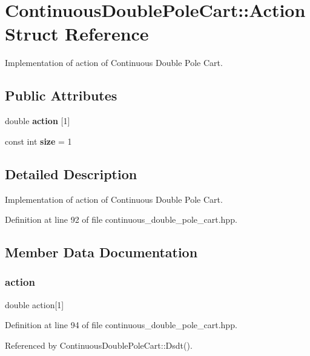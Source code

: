 \section{Continuous\+Double\+Pole\+Cart\+:\+:Action Struct Reference}
\label{structmlpack_1_1rl_1_1ContinuousDoublePoleCart_1_1Action}


Implementation of action of Continuous Double Pole Cart.  


\subsection*{Public Attributes}
\begin{DoxyCompactItemize}
\item 
double \textbf{ action} [1]
\item 
const int \textbf{ size} = 1
\end{DoxyCompactItemize}


\subsection{Detailed Description}
Implementation of action of Continuous Double Pole Cart. 

Definition at line 92 of file continuous\+\_\+double\+\_\+pole\+\_\+cart.\+hpp.



\subsection{Member Data Documentation}
\mbox{\label{structmlpack_1_1rl_1_1ContinuousDoublePoleCart_1_1Action_ab794acf36ef3d4b917753d5398116058}} 
\subsubsection{action}
{\footnotesize\ttfamily double action[1]}



Definition at line 94 of file continuous\+\_\+double\+\_\+pole\+\_\+cart.\+hpp.



Referenced by Continuous\+Double\+Pole\+Cart\+::\+Dsdt().

